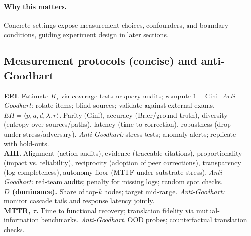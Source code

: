 \documentclass[12pt]{article}
\begin{document}
\paragraph{Why this matters.} Concrete settings expose measurement choices, confounders, and boundary conditions, guiding experiment design in later sections.

\subsection*{Measurement protocols (concise) and anti-Goodhart}
\textbf{EEI.} Estimate $K_i$ via coverage tests or query audits; compute $1{-}$Gini. \emph{Anti-Goodhart:} rotate items; blind sources; validate against external exams.\\
\textbf{$EH=\langle p,a,d,\lambda,r\rangle$.} Parity (Gini), accuracy (Brier/ground truth), diversity (entropy over sources/paths), latency (time-to-correction), robustness (drop under stress/adversary). \emph{Anti-Goodhart:} stress tests; anomaly alerts; replicate with hold-outs.\\
\textbf{AHI.} Alignment (action audits), evidence (traceable citations), proportionality (impact vs. reliability), reciprocity (adoption of peer corrections), transparency (log completeness), autonomy floor (MTTF under substrate stress). \emph{Anti-Goodhart:} red-team audits; penalty for missing logs; random spot checks.\\
\textbf{$D$ (dominance).} Share of top-$k$ nodes; target mid-range. \emph{Anti-Goodhart:} monitor cascade tails and response latency jointly.\\
\textbf{MTTR, $\tau$.} Time to functional recovery; translation fidelity via mutual-information benchmarks. \emph{Anti-Goodhart:} OOD probes; counterfactual translation checks.
\end{document}
